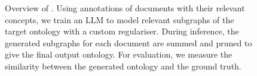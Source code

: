 \begin{figure}[t]
    \caption{Overview of \name. Using annotations of documents with their relevant concepts, we train an LLM to model relevant subgraphs of the target ontology with a custom regulariser. During inference, the generated subgraphs for each document are summed and pruned to give the final output ontology. For evaluation, we measure the similarity between the generated ontology and the ground truth. }
    \label{fig:overview}
\end{figure}